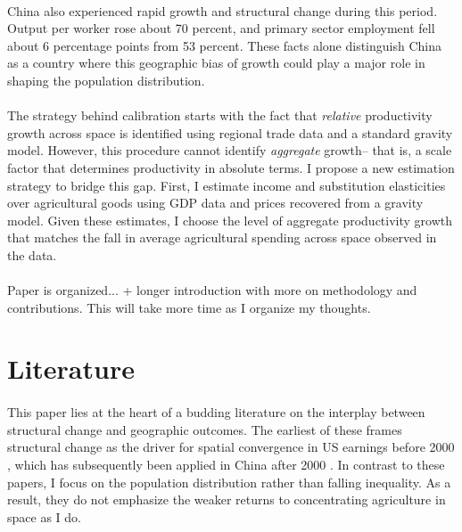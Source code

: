 \documentclass[]{article}
\begin{document}
 \paragraph*{}
 China also experienced rapid growth and structural change during this period. Output per worker rose about 70 percent, and primary sector employment fell about 6 percentage points from 53 percent.  These facts alone distinguish China as a country where this geographic bias of growth could play a major role in shaping the population distribution.
 \paragraph*{}
The strategy behind calibration starts with the fact that \textit{relative} productivity growth across space is identified using regional trade data and a standard gravity model. However, this procedure cannot identify \textit{aggregate} growth-- that is, a scale factor that determines productivity in absolute terms. I propose a new estimation strategy to bridge this gap. First, I estimate income and substitution elasticities over agricultural goods using GDP data and prices recovered from a gravity model. Given these estimates, I choose the level of aggregate productivity growth that matches the fall in average agricultural spending across space observed in the data. 
 \paragraph*{}
 Paper is organized... + longer introduction with more on methodology and contributions. This will take more time as I organize my thoughts. 


\section{Literature}
\paragraph*{}
This paper lies at the heart of a budding literature on the interplay between structural change and geographic outcomes. The earliest of these frames structural change as the driver for spatial convergence in US earnings before 2000 \citep{casellicoleman}, which has subsequently been applied in China after 2000 \citep{hao2020}. In contrast to these papers, I focus on the population distribution rather than falling inequality. As a result, they do not emphasize the weaker returns to concentrating agriculture in space as I do. 
\end{document}
